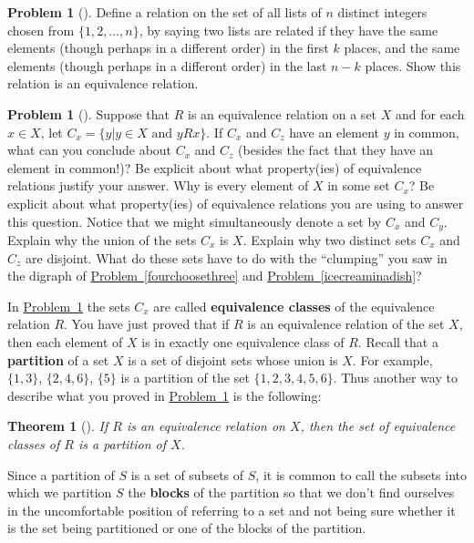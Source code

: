 \documentclass[10pt,]{book}
\newcommand{\terminology}[1]{\textbf{#1}}
\theoremstyle{plain}
\newtheorem{theorem}{Theorem}[section]
\theoremstyle{definition}
\newtheorem{activity}[project]{Problem}
\theoremstyle{definition}
\numberwithin{equation}{chapter}
\begin{document}
\begin{activity}[]\marginsymbol[-1em]{} \label{activity-351}
Define a relation on the set of all lists of \(n\) distinct integers chosen from \(\{1,2,\ldots, n\}\), by saying two lists are related if they have the same elements (though perhaps in a different order) in the first \(k\) places, and the same elements (though perhaps in a different order) in the last \(n-k\) places. Show this relation is an equivalence relation.%
\end{activity}
\begin{activity}[]\marginsymbol[-1em]{} \label{equivalenceclasses}
Suppose that \(R\) is an equivalence relation on a set \(X\) and for each \(x\in X\), let \(C_x = \{y| y\in X \text{ and }
yRx\}\). If \(C_x\) and \(C_z\) have an element \(y\) in common, what can you conclude about \(C_x\) and \(C_z\) (besides the fact that they have an element in common!)? Be explicit about what property(ies) of equivalence relations justify your answer. Why is every element of \(X\) in some set \(C_x\)? Be explicit about what property(ies) of equivalence relations you are using to answer this question. Notice that we might simultaneously denote a set by \(C_x\) and \(C_y\). Explain why the union of the sets \(C_x\) is \(X\). Explain why two distinct sets \(C_x\) and \(C_z\) are disjoint. What do these sets have to do with the ``clumping'' you saw in the digraph of \hyperref[fourchoosethree]{Problem~\ref{fourchoosethree}} and \hyperref[icecreaminadish]{Problem~\ref{icecreaminadish}}?%
\end{activity}
In \hyperref[equivalenceclasses]{Problem~\ref{equivalenceclasses}} the sets \(C_x\) are called \terminology{equivalence classes} of the equivalence relation \(R\). You have just proved that if \(R\) is an equivalence relation of the set \(X\), then each element of \(X\) is in exactly one equivalence class of \(R\). Recall that a \terminology{partition} of a set \(X\) is a set of disjoint sets whose union is \(X\). For example, \(\{1,3\}\), \(\{2,4,6\}\), \(\{5\}\) is a partition of the set \(\{1,2,3,4,5,6\}\). Thus another way to describe what you proved in \hyperref[equivalenceclasses]{Problem~\ref{equivalenceclasses}} is the following:%
\begin{theorem}[{}]\label{theorem-10}
If \(R\) is an equivalence relation on \(X\), then the set of equivalence classes of \(R\) is a partition of \(X\).%
\end{theorem}
Since a partition of \(S\) is a set of subsets of \(S\), it is common to call the subsets into which we partition \(S\) the \terminology{blocks} of the partition so that we don't find ourselves in the uncomfortable position of referring to a set and not being sure whether it is the set being partitioned or one of the blocks of the partition.%
\end{document}
